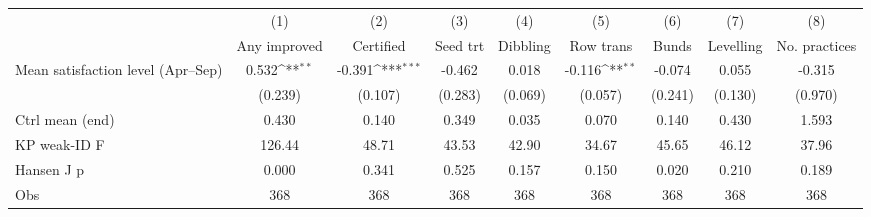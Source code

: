 {
\def\sym#1{\ifmmode^{#1}\else\(^{#1}\)\fi}
\begin{tabular}{l*{8}{c}}
\toprule
                    &\multicolumn{1}{c}{(1)}&\multicolumn{1}{c}{(2)}&\multicolumn{1}{c}{(3)}&\multicolumn{1}{c}{(4)}&\multicolumn{1}{c}{(5)}&\multicolumn{1}{c}{(6)}&\multicolumn{1}{c}{(7)}&\multicolumn{1}{c}{(8)}\\
                    &\multicolumn{1}{c}{Any improved}&\multicolumn{1}{c}{Certified}&\multicolumn{1}{c}{Seed trt}&\multicolumn{1}{c}{Dibbling}&\multicolumn{1}{c}{Row trans}&\multicolumn{1}{c}{Bunds}&\multicolumn{1}{c}{Levelling}&\multicolumn{1}{c}{No. practices}\\
\midrule
Mean satisfaction level (Apr--Sep)&       0.532\sym{**} &      -0.391\sym{***}&      -0.462         &       0.018         &      -0.116\sym{**} &      -0.074         &       0.055         &      -0.315         \\
                    &     (0.239)         &     (0.107)         &     (0.283)         &     (0.069)         &     (0.057)         &     (0.241)         &     (0.130)         &     (0.970)         \\
\midrule
Ctrl mean (end)     &       0.430         &       0.140         &       0.349         &       0.035         &       0.070         &       0.140         &       0.430         &       1.593         \\
KP weak-ID F        &      126.44         &       48.71         &       43.53         &       42.90         &       34.67         &       45.65         &       46.12         &       37.96         \\
Hansen J p          &       0.000         &       0.341         &       0.525         &       0.157         &       0.150         &       0.020         &       0.210         &       0.189         \\
Obs                 &         368         &         368         &         368         &         368         &         368         &         368         &         368         &         368         \\
\bottomrule
\end{tabular}
}
